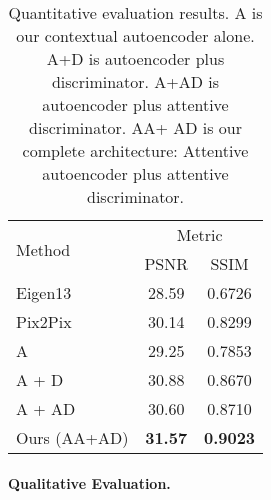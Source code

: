 \documentclass[10pt,twocolumn,letterpaper]{article}
\begin{document}
\begin{table}
	\normalsize
	\centering
	\renewcommand\arraystretch{1.1}
	\label{tab:quantitative_eval}
	\begin{tabular}{l|c|c}
		\hline
		\multirow{2}{*}{Method} &
		\multicolumn{2}{c}{Metric} \\
		\cline{2-3}
		& PSNR & SSIM  \\
		\hline
		Eigen13~\cite{eigen2013restoring} & 28.59 & 0.6726\\
		\hline
		Pix2Pix~\cite{isola2016image} & 30.14 & 0.8299\\
		\hline
		 A & 29.25 & 0.7853\\
		\hline
		 A + D & 30.88 & 0.8670\\
		\hline
		 A + AD & 30.60 & 0.8710\\
		\hline
		Ours (AA+AD) & \textbf{31.57} & \textbf{0.9023}\\
		\hline
	\end{tabular}
	
	\vspace{0.5cm}
	
	\caption{Quantitative evaluation results. A is our contextual autoencoder alone. A+D  is autoencoder plus discriminator. A+AD is autoencoder plus attentive discriminator. AA+ AD is our complete architecture: Attentive autoencoder plus attentive discriminator.}
\end{table}



\paragraph{Qualitative Evaluation.}
\end{document}
